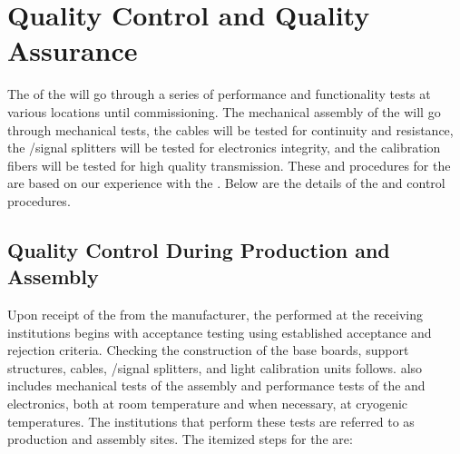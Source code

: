 \section{Quality Control and Quality Assurance}
\label{sec:dp-pds-quality}

The  of the \dual {} will go through a series of performance and functionality tests at various locations until commissioning. The mechanical assembly of the  will go through mechanical tests, the  cables will be tested for continuity and resistance, the /signal splitters will be tested for electronics integrity, and the calibration fibers will be tested for high quality transmission. These  and  procedures for the   are based on our experience with the . Below  are the details of the  and control procedures.

\subsection{Quality Control During Production and Assembly}

Upon receipt of the  from the manufacturer, the  performed at the receiving institutions begins with acceptance  testing %
using established acceptance and rejection criteria. %
Checking the construction of the base boards, support structures, cables, /signal splitters, and light calibration units follows.  also includes mechanical tests of the assembly and performance tests of the  and electronics, both at room temperature and when necessary, at cryogenic temperatures. The institutions that perform these tests are referred to as production and assembly sites. The itemized  steps for the  are:

